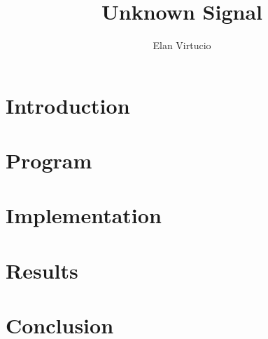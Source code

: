 \documentclass[a4paper,11pt]{article}
\begin{document}
\title{\Large{\textbf{Unknown Signal}}}
\author{Elan Virtucio}
\date{}
\maketitle

\section{Introduction}

\section{Program}

\section{Implementation}

\section{Results}

\section{Conclusion}
\end{document}
